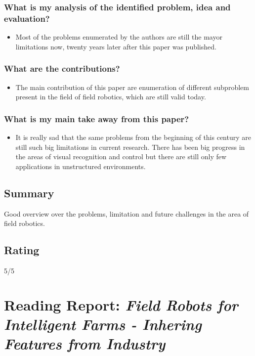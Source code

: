     \subsubsection*{What is my analysis of the identified problem, idea and evaluation?}
    \begin{itemize}
        \item Most of the problems enumerated by the authors are still the mayor limitations now, twenty years later after this paper was published. 
    \end{itemize}
    \subsubsection*{What are the contributions?}
    \begin{itemize}
        \item The main contribution of this paper are enumeration of different subproblem present in the field of field robotics, which are still valid today.
    \end{itemize}
    \subsubsection*{What is my main take away from this paper?}
    \begin{itemize}
        \item It is really sad that the same problems from the beginning of this century are still such big limitations in current research. There has been big progress in the areas of visual recognition and control but there are still only few applications in unstructured environments.
    \end{itemize}
    
    \subsection*{Summary}
    Good overview over the problems, limitation and future challenges in the area of field robotics.
    \subsection*{Rating}
    5/5

    \newpage
    
    \section{Reading Report: \emph{Field Robots for Intelligent Farms - Inhering Features from Industry}}
    \cite{deSantos2020}
    

